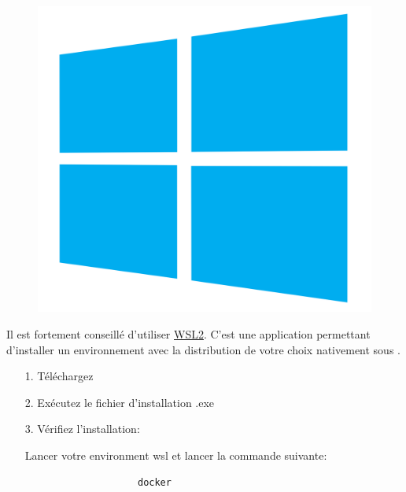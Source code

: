 \documentclass[internal]{nhitec_design}
\begin{document}
        \begin{figure}[h]
            \centering
            \includegraphics[scale=0.025]{Images_formation/WindowsLogo.png}
        \end{figure}

        Il est fortement conseillé d'utiliser \href{https://learn.microsoft.com/fr-fr/windows/wsl/install}{WSL2}. C'est une application \windows{} permettant d'installer un environnement \linux{} avec la distribution de votre choix nativement sous \windows{}.
        
        \begin{itemize}
            \item[1.] Téléchargez \href{https://desktop.docker.com/win/main/amd64/Docker%20Desktop%20Installer.exe}{\dockerdesktop{}}
            
            \item[2.] Exécutez le fichier d'installation .exe
            
            \item[3.] Vérifiez l'installation: 
            
                Lancer votre environment wsl et lancer la commande suivante:
                \begin{lstlisting}
                    docker
                \end{lstlisting}
        \end{itemize}
\end{document}
